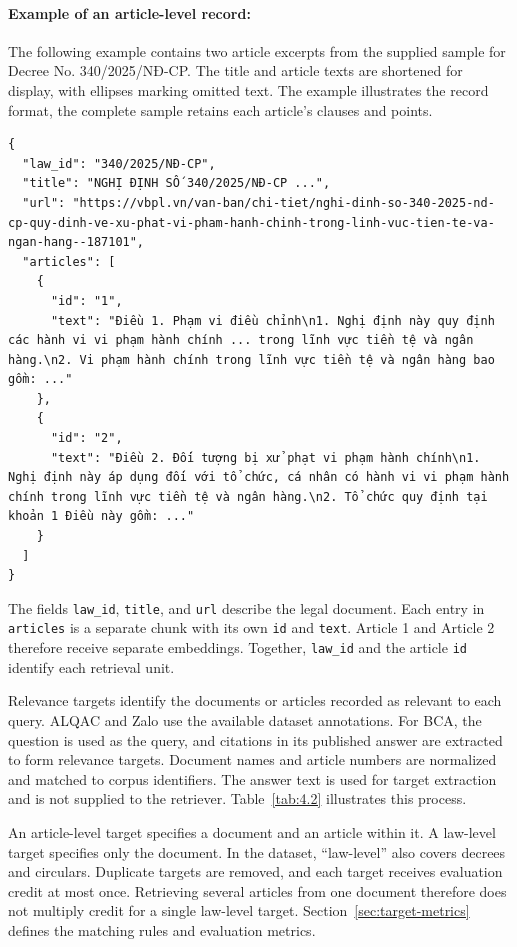 \paragraph{Example of an article-level record:}
The following example contains two article excerpts from the supplied sample for Decree No. 340/2025/NĐ-CP. The title and article texts are shortened for display, with ellipses marking omitted text. The example illustrates the record format, the complete sample retains each article's clauses and points.

\begin{Verbatim}[fontsize=\footnotesize,breaklines=true,breakanywhere=true]
{
  "law_id": "340/2025/NĐ-CP",
  "title": "NGHỊ ĐỊNH SỐ 340/2025/NĐ-CP ...",
  "url": "https://vbpl.vn/van-ban/chi-tiet/nghi-dinh-so-340-2025-nd-cp-quy-dinh-ve-xu-phat-vi-pham-hanh-chinh-trong-linh-vuc-tien-te-va-ngan-hang--187101",
  "articles": [
    {
      "id": "1",
      "text": "Điều 1. Phạm vi điều chỉnh\n1. Nghị định này quy định các hành vi vi phạm hành chính ... trong lĩnh vực tiền tệ và ngân hàng.\n2. Vi phạm hành chính trong lĩnh vực tiền tệ và ngân hàng bao gồm: ..."
    },
    {
      "id": "2",
      "text": "Điều 2. Đối tượng bị xử phạt vi phạm hành chính\n1. Nghị định này áp dụng đối với tổ chức, cá nhân có hành vi vi phạm hành chính trong lĩnh vực tiền tệ và ngân hàng.\n2. Tổ chức quy định tại khoản 1 Điều này gồm: ..."
    }
  ]
}
\end{Verbatim}

The fields \texttt{law\_id}, \texttt{title}, and \texttt{url} describe the legal document. Each entry in \texttt{articles} is a separate chunk with its own \texttt{id} and \texttt{text}. Article 1 and Article 2 therefore receive separate embeddings. Together, \texttt{law\_id} and the article \texttt{id} identify each retrieval unit.

Relevance targets identify the documents or articles recorded as relevant to each query. ALQAC and Zalo use the available dataset annotations. For BCA, the question is used as the query, and citations in its published answer are extracted to form relevance targets. Document names and article numbers are normalized and matched to corpus identifiers. The answer text is used for target extraction and is not supplied to the retriever. Table~\ref{tab:4.2} illustrates this process.

An article-level target specifies a document and an article within it. A law-level target specifies only the document. In the dataset, ``law-level'' also covers decrees and circulars. Duplicate targets are removed, and each target receives evaluation credit at most once. Retrieving several articles from one document therefore does not multiply credit for a single law-level target. Section~\ref{sec:target-metrics} defines the matching rules and evaluation metrics.

